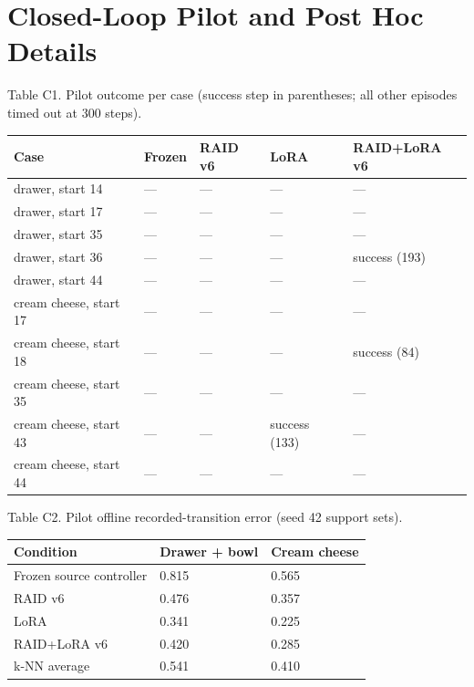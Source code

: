 \documentclass[11pt,a4paper]{article}
\begin{document}
\section{Closed-Loop Pilot and Post Hoc Details}


Table C1. Pilot outcome per case (success step in parentheses; all other episodes timed out at 300 steps).

{\def\LTcaptype{none} %
{\small
\begin{longtable}[]{@{}lllll@{}}
\toprule\noalign{}
Case & Frozen & RAID v6 & LoRA & RAID+LoRA v6 \\
\midrule\noalign{}
\endhead
\bottomrule\noalign{}
\endlastfoot
drawer, start 14 & --- & --- & --- & --- \\
drawer, start 17 & --- & --- & --- & --- \\
drawer, start 35 & --- & --- & --- & --- \\
drawer, start 36 & --- & --- & --- & success (193) \\
drawer, start 44 & --- & --- & --- & --- \\
cream cheese, start 17 & --- & --- & --- & --- \\
cream cheese, start 18 & --- & --- & --- & success (84) \\
cream cheese, start 35 & --- & --- & --- & --- \\
cream cheese, start 43 & --- & --- & success (133) & --- \\
cream cheese, start 44 & --- & --- & --- & --- \\
\end{longtable}
}
}

Table C2. Pilot offline recorded-transition error (seed 42 support sets).

{\def\LTcaptype{none} %
{\small
\begin{longtable}[]{@{}lll@{}}
\toprule\noalign{}
Condition & Drawer + bowl & Cream cheese \\
\midrule\noalign{}
\endhead
\bottomrule\noalign{}
\endlastfoot
Frozen source controller & 0.815 & 0.565 \\
RAID v6 & 0.476 & 0.357 \\
LoRA & 0.341 & 0.225 \\
RAID+LoRA v6 & 0.420 & 0.285 \\
k-NN average & 0.541 & 0.410 \\
\end{longtable}
}
}
\end{document}
